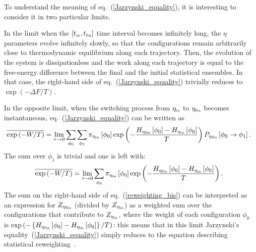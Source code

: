 \documentclass[11pt]{article}
\newcommand{\etain}{\eta_{\mbox{\tiny{in}}}}
\newcommand{\etafin}{\eta_{\mbox{\tiny{fin}}}}
\newcommand{\tin}{t_{\mbox{\tiny{in}}}}
\newcommand{\tfin}{t_{\mbox{\tiny{fin}}}}
\begin{document}
To understand the meaning of eq.~(\ref{Jarzynski_equality}), it is interesting to consider it in two particular limits.

In the limit when the $[\tin, \tfin]$ time interval becomes infinitely long, the $\eta$ parameters evolve infinitely slowly, so that the configurations remain arbitrarily close to thermodynamic equilibrium along each trajectory. Then, the evolution of the system is dissipationless and the work along each trajectory is equal to the free-energy difference between the final and the initial statistical ensembles. In that case, the right-hand side of eq.~(\ref{Jarzynski_equality}) trivially reduces to $\exp(-\Delta F/T)$.

In the opposite limit, when the switching process from $\etain$ to $\etafin$ becomes instantaneous, eq.~(\ref{Jarzynski_equality}) can be written as
\begin{equation}
\label{reweighting}
\overline{\exp \left( -W/T \right)} = \lim_{\tau \to 0} \sum_{\phi_0} \sum_{\phi_1}\pi_{\etain}\left[ \phi_0 \right] \exp \left( -\frac{H_{\etafin}\left[\phi_0\right] - H_{\etain}\left[\phi_0\right]}{T}\right) P_{\etafin}\left[ \phi_0 \to \phi_1 \right].
\end{equation}
The sum over $\phi_1$ is trivial and one is left with:
\begin{equation}
\label{reweighting_bis}
\overline{\exp \left( -W/T \right)} = \lim_{\tau \to 0} \sum_{\phi_0} \pi_{\etain}\left[ \phi_0 \right] \exp\left( -\frac{H_{\etafin}\left[\phi_0\right] - H_{\etain}\left[\phi_0\right]}{T}\right).
\end{equation}
The sum on the right-hand side of eq.~(\ref{reweighting_bis}) can be interpreted as an expression for $Z_{\etafin}$ (divided by $Z_{\etain}$) as a weighted sum over the configurations that contribute to $Z_{\etain}$, where the weight of each configuration $\phi_0$ is $\exp\left( -\left\{H_{\etafin}\left[\phi_0\right] - H_{\etain}\left[\phi_0\right]\right\}/T\right)$: this means that in this limit Jarzynski's equality~(\ref{Jarzynski_equality}) simply reduces to the equation describing statistical reweighting~\cite{Ferrenberg:1988yz}.
\end{document}
